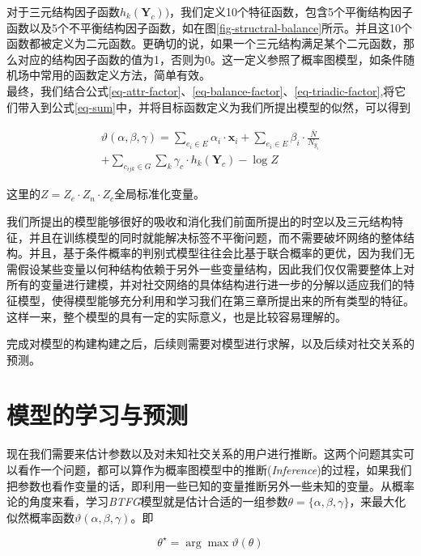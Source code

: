 对于三元结构因子函数$h_k (\bm{Y}_c))$，我们定义10个特征函数，包含5个平衡结构因子函数以及5个不平衡结构因子函数，如在图\ref{fig-structral-balance}所示。并且这10个函数都被定义为二元函数。更确切的说，如果一个三元结构满足某个二元函数，那么对应的结构因子函数的值为1，否则为0。这一定义参照了概率图模型，如条件随机场中常用的函数定义方法，简单有效。 \\

最终，我们结合公式\ref{eq-attr-factor}、\ref{eq-balance-factor}、\ref{eq-triadic-factor},将它们带入到公式\ref{eq-sum}中，并将目标函数定义为我们所提出模型的似然，可以得到

\begin{equation}
\begin{split}
\vartheta(\alpha, \beta, \gamma) = \sum_{e_i \in E}\alpha_i \cdot \textbf{x}_i + \sum_{e_i \in E}\beta_i \cdot \frac{\overline{N}}{N_{y_i}}  \\ + \sum_{c_{ijk} \in G} \sum_{k}\gamma_c \cdot h_k (\textbf{Y}_c) - \log{Z}
\end{split}
\end{equation}

这里的$Z = Z_e \cdot Z_n \cdot Z_c$全局标准化变量。

我们所提出的模型能够很好的吸收和消化我们前面所提出的时空以及三元结构特征，并且在训练模型的同时就能解决标签不平衡问题，而不需要破坏网络的整体结构。并且，基于条件概率的判别式模型往往会比基于联合概率的更优，因为我们无需假设某些变量以何种结构依赖于另外一些变量结构，因此我们仅仅需要整体上对所有的变量进行建模，并对社交网络的具体结构进行进一步的分解以适应我们的特征模型，使得模型能够充分利用和学习我们在第三章所提出来的所有类型的特征。这样一来，整个模型的具有一定的实际意义，也是比较容易理解的。

完成对模型的构建构建之后，后续则需要对模型进行求解，以及后续对社交关系的预测。


\section{模型的学习与预测}
现在我们需要来估计参数以及对未知社交关系的用户进行推断。这两个问题其实可以看作一个问题，都可以算作为概率图模型中的推断(\textit{Inference})的过程，如果我们把参数也看作变量的话，即利用一些已知的变量推断另外一些未知的变量。从概率论的角度来看，学习\textit{BTFG}模型就是估计合适的一组参数$ \theta = { \{ \alpha, \beta, \gamma \} } $，来最大化似然概率函数$ \vartheta(\alpha, \beta, \gamma) $。即

\begin{equation}
\theta^\star = \arg \max\vartheta(\theta)
\end{equation}

